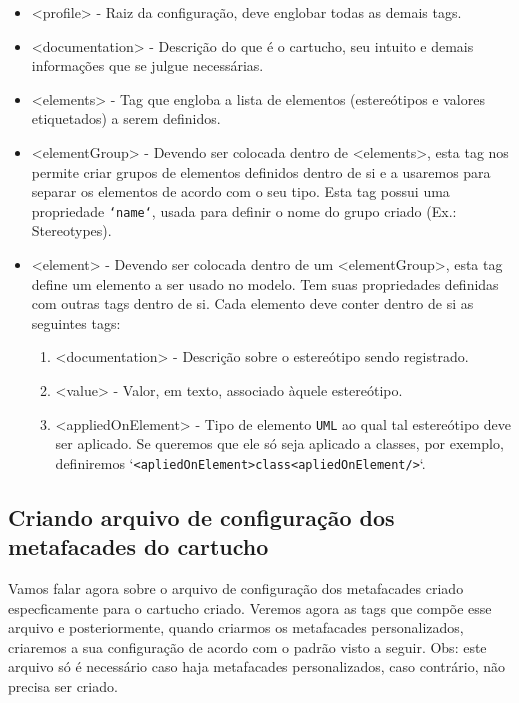 \begin{enumerate}
\begin{itemize}
  \item <profile> - Raiz da configuração, deve englobar todas as demais tags.
  \item <documentation> - Descrição do que é o cartucho, seu intuito e demais
  informações que se julgue necessárias.
  \item <elements> - Tag que engloba a lista de elementos (estereótipos e
  valores etiquetados) a serem definidos.
  \item <elementGroup> - Devendo ser colocada dentro de <elements>, esta tag
  nos permite criar grupos de elementos definidos dentro de si e a usaremos para
  separar os elementos de acordo com o seu tipo. Esta tag possui uma propriedade
  \texttt{`name`}, usada para definir o nome do grupo criado (Ex.: Stereotypes).
  \item <element> - Devendo ser colocada dentro de um <elementGroup>, esta tag
  define um elemento a ser usado no modelo. Tem suas propriedades definidas com
  outras tags dentro de si. Cada elemento deve conter dentro de si as seguintes
  tags:
  \begin{enumerate}
    \item <documentation> - Descrição sobre o estereótipo sendo registrado.
    \item <value> - Valor, em texto, associado àquele estereótipo.
    \item <appliedOnElement> - Tipo de elemento \texttt{UML} ao qual tal
    estereótipo deve ser aplicado. Se queremos que ele só seja aplicado a
    classes, por exemplo, definiremos 
    `\texttt{<apliedOnElement>class<apliedOnElement/>}`.
  \end{enumerate}
\end{itemize}

\end{enumerate}

\subsection{Criando arquivo de configuração dos metafacades do cartucho}
Vamos falar agora sobre o arquivo de configuração dos metafacades criado
especficamente para o cartucho criado. Veremos agora as tags que compõe esse
arquivo e posteriormente, quando criarmos os metafacades personalizados,
criaremos a sua configuração de acordo com o padrão visto a seguir. Obs: este
arquivo só é necessário caso haja metafacades personalizados, caso contrário,
não precisa ser criado.

